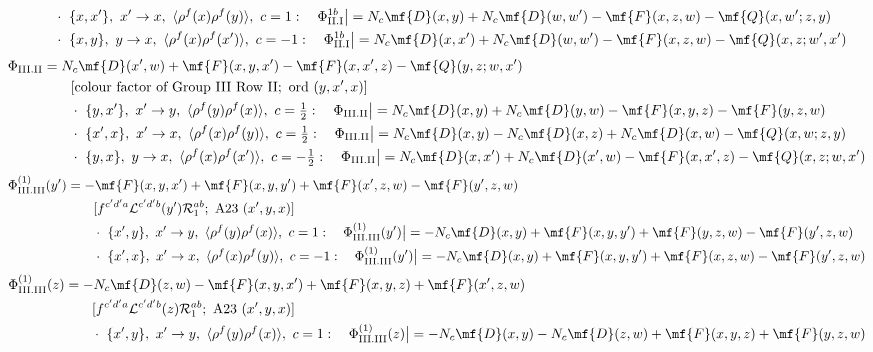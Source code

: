 {\begin{align}
&\qquad\cdot\ \{x,x'\},\ x'\to x,\ \langle\rho^{f}(x)\rho^{f}(y)\rangle,\ c=1:\quad \Phi_{\rm II.I}^{1b}\big|=N_{c}\mf{D}(x,y)+N_{c}\mf{D}(w,w')-\mf{F}(x,z,w)-\mf{Q}(x,w';z,y)\notag\\
&\qquad\cdot\ \{x,y\},\ y\to x,\ \langle\rho^{f}(x)\rho^{f}(x')\rangle,\ c=-1:\quad \Phi_{\rm II.I}^{1b}\big|=N_{c}\mf{D}(x,x')+N_{c}\mf{D}(w,w')-\mf{F}(x,z,w)-\mf{Q}(x,z;w',x')\notag
\end{align}
\begin{align}
\Phi_{\rm III.II}&=N_{c}\mf{D}(x',w)+\mf{F}(x,y,x')-\mf{F}(x,x',z)-\mf{Q}(y,z;w,x')\notag\\&\qquad[\text{colour factor of Group III Row II};\ \text{ord}\ (y,x',x)]\notag\\
&\qquad\cdot\ \{y,x'\},\ x'\to y,\ \langle\rho^{f}(y)\rho^{f}(x)\rangle,\ c=\tfrac{1}{2}:\quad \Phi_{\rm III.II}\big|=N_{c}\mf{D}(x,y)+N_{c}\mf{D}(y,w)-\mf{F}(x,y,z)-\mf{F}(y,z,w)\notag\\
&\qquad\cdot\ \{x',x\},\ x'\to x,\ \langle\rho^{f}(x)\rho^{f}(y)\rangle,\ c=\tfrac{1}{2}:\quad \Phi_{\rm III.II}\big|=N_{c}\mf{D}(x,y)-N_{c}\mf{D}(x,z)+N_{c}\mf{D}(x,w)-\mf{Q}(x,w;z,y)\notag\\
&\qquad\cdot\ \{y,x\},\ y\to x,\ \langle\rho^{f}(x)\rho^{f}(x')\rangle,\ c=-\tfrac{1}{2}:\quad \Phi_{\rm III.II}\big|=N_{c}\mf{D}(x,x')+N_{c}\mf{D}(x',w)-\mf{F}(x,x',z)-\mf{Q}(x,z;w,x')\notag
\end{align}
\begin{align}
\Phi_{\rm III.III}^{(1)}(y')&=-\mf{F}(x,y,x')+\mf{F}(x,y,y')+\mf{F}(x',z,w)-\mf{F}(y',z,w)\notag\\&\qquad[f^{c'd'a}\mathcal{L}^{c'd'b}(y')\mathcal{R}_{1}^{ab};\ \text{A23}\ (x',y,x)]\notag\\
&\qquad\cdot\ \{x',y\},\ x'\to y,\ \langle\rho^{f}(y)\rho^{f}(x)\rangle,\ c=1:\quad \Phi_{\rm III.III}^{(1)}(y')\big|=-N_{c}\mf{D}(x,y)+\mf{F}(x,y,y')+\mf{F}(y,z,w)-\mf{F}(y',z,w)\notag\\
&\qquad\cdot\ \{x',x\},\ x'\to x,\ \langle\rho^{f}(x)\rho^{f}(y)\rangle,\ c=-1:\quad \Phi_{\rm III.III}^{(1)}(y')\big|=-N_{c}\mf{D}(x,y)+\mf{F}(x,y,y')+\mf{F}(x,z,w)-\mf{F}(y',z,w)\notag
\end{align}
\begin{align}
\Phi_{\rm III.III}^{(1)}(z)&=-N_{c}\mf{D}(z,w)-\mf{F}(x,y,x')+\mf{F}(x,y,z)+\mf{F}(x',z,w)\notag\\&\qquad[f^{c'd'a}\mathcal{L}^{c'd'b}(z)\mathcal{R}_{1}^{ab};\ \text{A23}\ (x',y,x)]\notag\\
&\qquad\cdot\ \{x',y\},\ x'\to y,\ \langle\rho^{f}(y)\rho^{f}(x)\rangle,\ c=1:\quad \Phi_{\rm III.III}^{(1)}(z)\big|=-N_{c}\mf{D}(x,y)-N_{c}\mf{D}(z,w)+\mf{F}(x,y,z)+\mf{F}(y,z,w)\notag\\

\end{align}}
